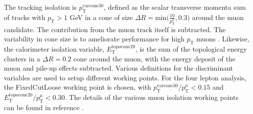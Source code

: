 The tracking isolation is $p_{\text{T}}^{\text{varcone30}}$, defined as the scalar transverse momenta sum of tracks with $p_{\text{T}}>1$ GeV in a cone of size $\Delta R=\text{min}\Big(\frac{10}{p_{\text{T}}^{\mu}},0.3\Big)$ around the muon candidate. The contribution from the muon track itself is subtracted. The variability in cone size is to ameliorate performance for high $p_{\text{T}}$ muons \cite{ATLAS_muon_reco_2016}. Likewise, the calorimeter isolation variable, $E_{\text{T}}^{\text{topocone20}}$, is the sum of the topological energy clusters in a $\Delta R=0.2$ cone around the muon, with the energy deposit of the muon and pile-up effects subtracted. Various definitions for the discriminant variables are used to setup different working points. For the four lepton analysis, the FixedCutLoose working point is chosen, with $p_{\text{T}}^{\text{varcone30}}/p_{\text{T}}^{\mu}<0.15$ and $E_{\text{T}}^{\text{topocone20}}/p_{\text{T}}^{\mu}<0.30$. The details of the various muon isolation working points can be found in reference \cite{ATLAS_muon_reco_2016}.

\cite{ATLAS:2020xtq}

